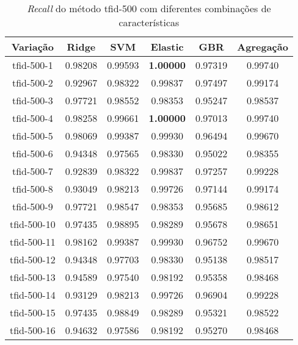 \begin{table}[H]
\centering
\begin{tabular}{|c| c c  c  c  c| }
\hline
Variação &  Ridge & SVM & Elastic & GBR & Agregação  \\ 
\hline
tfid-500-1 & 0.98208 & 0.99593 & \textbf{1.00000} & 0.97319 & 0.99740 \\
\hline
tfid-500-2 & 0.92967 & 0.98322 & 0.99837 & 0.97497 & 0.99174 \\
\hline
tfid-500-3 & 0.97721 & 0.98552 & 0.98353 & 0.95247 & 0.98537 \\
\hline
tfid-500-4 & 0.98258 & 0.99661 & \textbf{1.00000} & 0.97013 & 0.99740 \\
\hline
tfid-500-5 & 0.98069 & 0.99387 & 0.99930 & 0.96494 & 0.99670 \\
\hline
tfid-500-6 & 0.94348 & 0.97565 & 0.98330 & 0.95022 & 0.98355 \\
\hline
tfid-500-7 & 0.92839 & 0.98322 & 0.99837 & 0.97257 & 0.99228 \\
\hline
tfid-500-8 & 0.93049 & 0.98213 & 0.99726 & 0.97144 & 0.99174 \\
\hline
tfid-500-9 & 0.97721 & 0.98547 & 0.98353 & 0.95685 & 0.98612 \\
\hline
tfid-500-10 & 0.97435 & 0.98895 & 0.98289 & 0.95678 & 0.98651 \\
\hline
tfid-500-11 & 0.98162 & 0.99387 & 0.99930 & 0.96752 & 0.99670 \\
\hline
tfid-500-12 & 0.94348 & 0.97703 & 0.98330 & 0.95138 & 0.98517 \\
\hline
tfid-500-13 & 0.94589 & 0.97540 & 0.98192 & 0.95358 & 0.98468 \\
\hline
tfid-500-14 & 0.93129 & 0.98213 & 0.99726 & 0.96904 & 0.99228 \\
\hline
tfid-500-15 & 0.97435 & 0.98849 & 0.98289 & 0.95321 & 0.98522 \\
\hline
tfid-500-16 & 0.94632 & 0.97586 & 0.98192 & 0.95270 & 0.98468 \\
\hline
\end{tabular}
\caption{\textit{Recall} do método tfid-500 com diferentes combinações de características}
\label{tab:recalltfid500}
\end{table}

